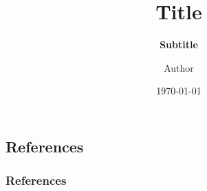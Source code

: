 \documentclass{misc/layout_slides}
\title{{\LARGE Title} \vspace{1cm}}
\subtitle{{\LARGE \textbf{Subtitle}}}
\author[shortname]{Author}
\institute[shortinst]{Institution}
\date{\small{\today}}
\begin{document}
\frame{\titlepage} 



\appendix

\backupbegin
\subsection{References}
\begin{frame}[allowframebreaks]
\frametitle{References}
\printbibliography 
\end{frame}
\end{document}
